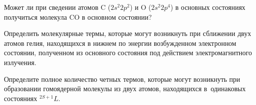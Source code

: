 \par
{} Может ли при сведении атомов $\text{C}$ ($2s^2 2p^2$) и $\text{O}$ ($2s^2 2p^4$) в основных состояниях получиться молекула $\text{CO}$ в основном состоянии?
\par
{} Определить молекулярные термы, которые могут возникнуть при сближении двух атомов гелия, находящихся в нижнем по энергии возбужденном электронном состоянии, полученном из основного состояния под действием электромагнитного излучения.
\par
{} Определите полное количество четных термов, которые могут возникнуть при образовании гомоядерной молекулы из двух атомов, находящихся в~одинаковых состояниях $^{2S + 1}L$.
\par